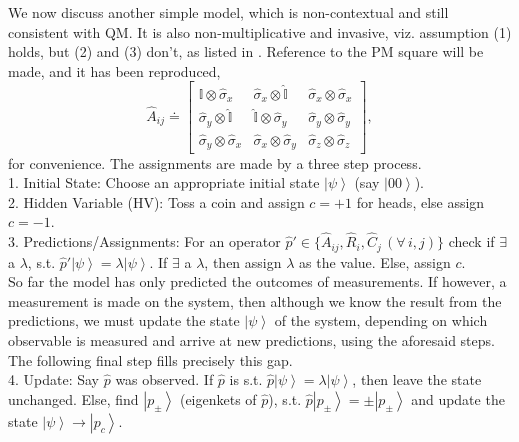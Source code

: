 We now discuss another simple model, which is non-contextual and still
consistent with QM. It is also non-multiplicative and invasive, viz.
assumption (1) holds, but (2) and (3) don't, as listed in .
Reference to the PM square will be made, and it has been reproduced,
\[
\hat{A}_{ij}\doteq\left[\begin{array}{ccc}
\hat{\mathbb{I}}\otimes\hat{\sigma}_{x} & \hat{\sigma}_{x}\otimes\hat{\mathbb{I}} & \hat{\sigma}_{x}\otimes\hat{\sigma}_{x}\\
\hat{\sigma}_{y}\otimes\hat{\mathbb{I}} & \hat{\mathbb{I}}\otimes\hat{\sigma}_{y} & \hat{\sigma}_{y}\otimes\hat{\sigma}_{y}\\
\hat{\sigma}_{y}\otimes\hat{\sigma}_{x} & \hat{\sigma}_{x}\otimes\hat{\sigma}_{y} & \hat{\sigma}_{z}\otimes\hat{\sigma}_{z}
\end{array}\right],
\]
for convenience. The assignments are made by a three step process.\\
\quad{}1. Initial State: Choose an appropriate initial state $\left|\psi\right\rangle $
(say $\left|00\right\rangle $).\\
\quad{}2. Hidden Variable (HV): Toss a coin and assign $c=+1$ for
heads, else assign $c=-1$.\\
\quad{}3. Predictions/Assignments: For an operator $\hat{p}'\in\{\hat{A}_{ij},\hat{R}_{i},\hat{C}_{j}\,(\forall\,i,j)\}$
check if $\exists$ a $\lambda$, s.t. $\hat{p}'\left|\psi\right\rangle =\lambda\left|\psi\right\rangle $.
If $\exists$ a $\lambda$, then assign $\lambda$ as the value. Else,
assign $c$.\\
So far the model has only predicted the outcomes of measurements.
If however, a measurement is made on the system, then although we
know the result from the predictions, we must update the state $\left|\psi\right\rangle $
of the system, depending on which observable is measured and arrive
at new predictions, using the aforesaid steps. The following final
step fills precisely this gap. \\
\quad{}4. Update: Say $\hat{p}$ was observed. If $\hat{p}$ is s.t.
$\hat{p}\left|\psi\right\rangle =\lambda\left|\psi\right\rangle $,
then leave the state unchanged. Else, find $\left|p_{\pm}\right\rangle $
(eigenkets of $\hat{p}$), s.t. $\hat{p}\left|p_{\pm}\right\rangle =\pm\left|p_{\pm}\right\rangle $
and update the state $\left|\psi\right\rangle \to\left|p_{c}\right\rangle $. 

